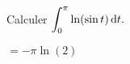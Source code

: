 \begin{exercice}
    Calculer $\displaystyle \int_0^\pi \ln(\sin t) \, \mathrm{d} t.$
\end{exercice}

\begin{elem_sol}
    $=-\pi \ln(2)$
\end{elem_sol}